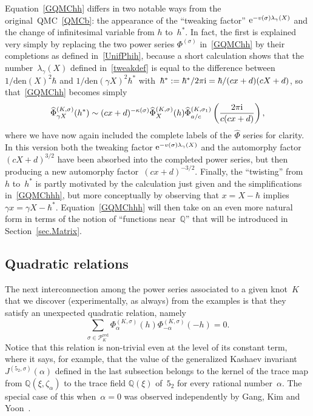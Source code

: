 \documentclass[pdftex]{sigma}
\numberwithin{equation}{section}
\def\l{\lambda}
\def\k{\kappa}
\def\z{\zeta}
\def\Phih{\widehat\Phi}
\def\a{\alpha}
\def\l{\lambda}
\def\h{\hbar}
\def\Q{\mathbb Q}
\def\a{\alpha}
\def\l{\lambda}
\def\z{\zeta}
\def\s{\sigma}
\def\den{\mathrm{den}}
\def\be{\begin{equation}}
\def\ee{\end{equation}}
\def\g{\gamma}
\def\RED{^{\text{red}}}
\def\calPx{\mathcal{P}\RED} %
\begin{document}
Equation~\eqref{GQMChh} differs in two notable ways from the original~QMC~\eqref{QMCb}:
the appearance of the ``tweaking factor'' ${\rm e}^{-v(\s)\l_\g(X)}$ and the change of
infinitesimal variable from $h$ to~$h^*$. In fact, the first is explained very simply
by replacing the two power series $\Phi^{(\s)}$ in~\eqref{GQMChh} by their completions
as defined in~\eqref{UnifPhih}, because a short calculation shows that the number~$\l_\g(X)$ defined in~\eqref{tweakdef} is equal to the difference between
$1/\den(X)^2\hbar$ and $1/\den(\g X)^2\hbar^*$ with~${\hbar^*:=\h^*/2\pi {\rm i}=\hbar/(cx+d)(cX+d)}$, so that~\eqref{GQMChh} becomes simply
\be
\label{GQMChhh}
\Phih_{\g X} ^{(K,\s)}(h^*)  \sim (cx+d)^{-\k(\s)} \Phih_X^{(K,\s)}(h)
 \Phih^{(K,\s_1)}_{a/c}\left(\frac{2\pi {\rm i}}{c(cx+d)}\right) ,
\ee
where we have now again included the complete labels of the $\Phih$ series for clarity.
In this version both the tweaking factor ${\rm e}^{-v(\s)\l_\g(X)}$ and the automorphy
factor~$(cX+d)^{3/2}$ have been absorbed into the completed power series, but then
producing a new automorphy factor~${(cx+d)^{-3/2}}$. Finally, the ``twisting'' from $h$
to~$h^*$ is partly motivated by the calculation just given and the simplifications
in~\eqref{GQMChhh}, but more conceptually by observing that $x=X-\hbar$ implies
${\g x=\g X-\hbar^*}$. Equation~\eqref{GQMChhh} will then take on an even more natural
form in terms of the notion of ``functions near~$\Q$'' that will be introduced in
Section~\ref{sec.Matrix}.

\subsection{Quadratic relations}
\label{sub.quad}

The next interconnection among the power series \smash{$\Phi_\a^{(K,\s)}(h)$}
associated to a given knot~$K$ that we discover (experimentally, as always)
from the examples is that they satisfy an unexpected quadratic relation, namely
\be
\label{quadrel}
\sum_{\s \in \calPx_K} \Phi^{(K,\s)}_\a(h) \Phi^{(K,\s)}_{-\a}(-h) = 0 .
\ee
Notice that this relation is non-trivial even at the level of its constant term,
where it says, for example, that the value of the generalized Kashaev invariant
$J^{(5_2,\sigma)}(\alpha)$ defined in the last subsection belongs to the kernel
of the trace map from $\Q(\xi,\z_\a)$ to the trace field $\Q(\xi)$ of~$5_2$
for every rational number~$\a$. The special case of this when~$\a=0$
was observed independently by Gang, Kim and Yoon~\cite{torsion}.
\end{document}
